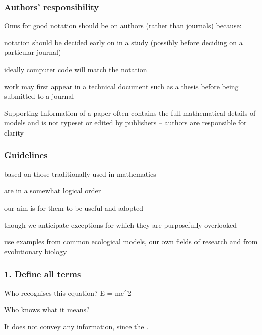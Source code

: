 \begin{frame}
\frametitle{Authors' responsibility}
Onus for good notation should be on authors (rather than journals)
because:
\bi
  \item notation should be decided early on in a study (possibly before deciding on a
    particular journal)
  \item ideally computer code will match the notation
  \item  work may first appear in a technical document such as a thesis before being
      submitted to a journal
  \item Supporting Information of a paper often contains the full mathematical details of
models and is not typeset or edited by publishers -- authors are responsible for
clarity
\ei
\end{frame}


\begin{frame}
\frametitle{Guidelines}
\bi
  \item based on those traditionally used in mathematics
  \item are in a somewhat logical order
  \item our aim is for them to be useful and adopted
  \item though we anticipate exceptions for which they are purposefully
    overlooked
  \item use examples from common ecological models, our own fields of research and from evolutionary biology
\ei
\end{frame}


\begin{frame}
\frametitle{1. Define all terms}

Who recognises this equation?
\eb
\nonumber E = mc^2
\ee

\pause Who knows what it means?

\medskip

\pause It does not convey any information, since the .

\end{frame}


